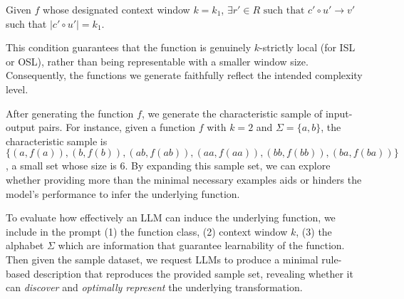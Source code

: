 \begin{definition}
Given $f$ whose designated context window $k = k_1$, $\exists r'\in R \text{ such that } c'\circ u'\to v'$ such that $|c'\circ u'| = k_1$.
\end{definition}

This condition guarantees that the function is genuinely $k$-strictly local (for ISL or OSL), rather than being representable with a smaller window size. Consequently, the functions we generate faithfully reflect the intended complexity level.

After generating the function $f$, we generate the characteristic sample of input-output pairs. For instance, given a function $f$ with $k = 2$ and $\Sigma = \{a, b\}$, the characteristic sample is $\{(a, f(a)),(b, f(b)), (ab, f(ab)), (aa, f(aa)), (bb, f(bb)), (ba, f(ba))\}$, a small set whose size is 6. By expanding this sample set, we can explore whether providing more than the minimal necessary examples aids or hinders the model's performance to infer the underlying function.

To evaluate how effectively an LLM can induce the underlying function, we include in the prompt (1) the function class, (2) context window $k$, (3) the alphabet $\Sigma$ which are information that guarantee learnability of the function. Then given the sample dataset, we request LLMs to produce a minimal rule-based description that reproduces the provided sample set, revealing whether it can \emph{discover} and \emph{optimally represent} the underlying transformation.

